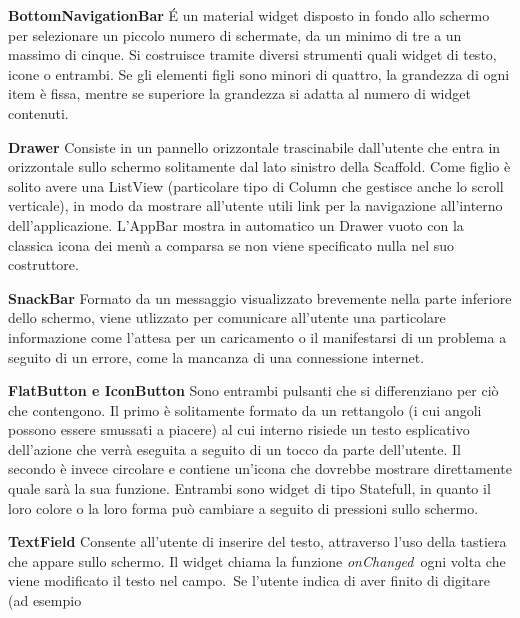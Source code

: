 \begin{trivlist}
		\item \textbf{BottomNavigationBar} \newline
		\'E un material widget disposto in fondo allo schermo per selezionare un
		piccolo numero di schermate, da un minimo di tre a un massimo di cinque.
		Si costruisce tramite diversi strumenti quali widget di testo, icone o
		entrambi. Se gli elementi figli sono minori di quattro, la grandezza di
		ogni item è fissa, mentre se superiore la grandezza si adatta al numero
		di widget contenuti.
		\item \textbf{Drawer} \newline
		Consiste in un pannello orizzontale trascinabile dall'utente che entra
		in orizzontale sullo schermo
		solitamente dal lato sinistro della Scaffold. Come figlio è solito avere
		una ListView (particolare tipo di Column che gestisce anche lo scroll
		verticale), in modo da mostrare all'utente utili link per la navigazione
		all'interno dell'applicazione. L'AppBar mostra in automatico un Drawer
		vuoto con la classica icona dei menù a comparsa se non viene specificato
		nulla nel suo costruttore.
		\item \textbf{SnackBar} \newline
		Formato da un messaggio visualizzato brevemente
		nella parte inferiore dello schermo, viene utlizzato per comunicare
		all'utente una particolare informazione come l'attesa per un caricamento
		o il manifestarsi di un problema a seguito di un errore, come la
		mancanza di una connessione internet.
		\item \textbf{FlatButton e IconButton} \newline
		Sono entrambi pulsanti che si differenziano per ciò che contengono. Il
		primo è solitamente formato da un rettangolo (i cui angoli possono
		essere smussati a piacere) al cui interno risiede un testo esplicativo
		dell'azione che verrà eseguita a seguito di un tocco da parte
		dell'utente. Il secondo è invece circolare e contiene un'icona che
		dovrebbe mostrare direttamente quale sarà la sua funzione. Entrambi sono
		widget di tipo Statefull, in quanto il loro colore o la loro forma può
		cambiare a seguito di pressioni sullo schermo.
		\item \textbf{TextField} \newline
		Consente all'utente di inserire del testo, attraverso l'uso della
		tastiera che appare sullo schermo. Il widget chiama la funzione
		\textit{onChanged} ogni volta che viene modificato il testo nel campo. Se
		l'utente indica di aver finito di digitare (ad esempio

\end{trivlist}

